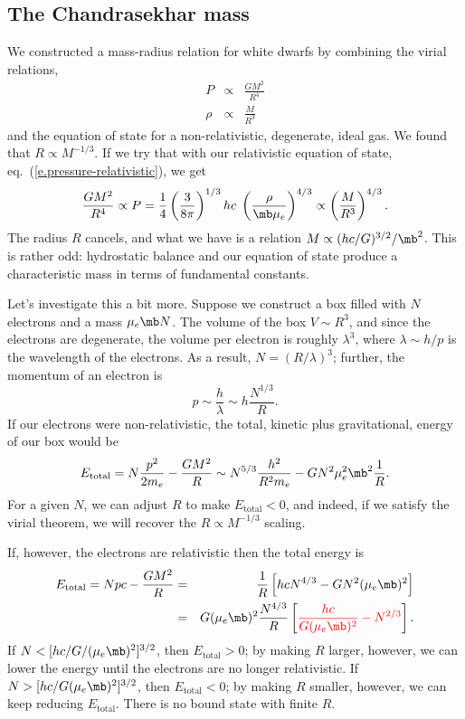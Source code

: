 \subsection{The Chandrasekhar mass}
We constructed a mass-radius relation for white dwarfs by combining the virial relations,
\begin{eqnarray*}
   P    &\propto& \frac{GM^{2}}{R^{4}}\\
   \rho &\propto& \frac{M}{R^{3}}
\end{eqnarray*}
and the equation of state for a non-relativistic, degenerate, ideal gas.  We found that $R\propto M^{-1/3}$.  If we try that with our relativistic equation of state, eq.~(\ref{e.pressure-relativistic}), we get
\[
	\frac{GM^{2}}{R^{4}} \propto P = \frac{1}{4}\left(\frac{3}{8\pi}\right)^{1/3}hc\; \left(\frac{\rho}{\mb\mu_{e}}\right)^{4/3} \propto \left(\frac{M}{R^{3}}\right)^{4/3}.
\]
The radius $R$ cancels, and what we have is a relation $M\propto (hc/G)^{3/2}/\mb^{2}$.  This is rather odd: hydrostatic balance and our equation of state produce a characteristic mass in terms of fundamental constants.

Let's investigate this a bit more.  Suppose we construct a box filled with $N$ electrons and a mass $\mu_{e}\mb N$.  The volume of the box $V \sim R^{3}$, and since the electrons are degenerate, the volume per electron is roughly $\lambda^{3}$, where $\lambda \sim h/p$ is the wavelength of the electrons.  As a result, $N = (R/\lambda)^{3}$; further, the momentum of an electron is
\[	p \sim \frac{h}{\lambda} \sim h\frac{N^{1/3}}{R}. \]
If our electrons were non-relativistic, the total, kinetic plus gravitational, energy of our box would be
\[
	E_{\mathrm{total}} = N\frac{p^{2}}{2m_{e}} - \frac{GM^{2}}{R} \sim N^{5/3}\frac{h^{2}}{R^{2}m_{e}} - GN^{2}\mu_{e}^{2}\mb^{2} \frac{1}{R}.
\]
For a given $N$, we can adjust $R$ to make $E_{\mathrm{total}}<0$, and indeed, if we satisfy the virial theorem, we will recover the $R\propto M^{-1/3}$ scaling.

If, however, the electrons are relativistic then the total energy is
\begin{eqnarray*}
	E_{\mathrm{total}} = Npc - \frac{GM^{2}}{R} 
		&=& \frac{1}{R}\left[hc N^{4/3} - G N^{2}(\mu_{e}\mb)^{2}\right]\\
		&=& G(\mu_{e}\mb)^{2}\frac{N^{4/3}}{R}\left[ {\color{red}\frac{hc}{G(\mu_{e}\mb)^{2}} - N^{2/3}}\right].
\end{eqnarray*}
If $N < [hc/G/(\mu_{e}\mb)^{2}]^{3/2}$, then $E_{\mathrm{total}} > 0$; by making $R$ larger, however, we can lower the energy until the electrons are no longer relativistic.  If $N > [hc/G(\mu_{e}\mb)^{2}]^{3/2}$, then $E_{\mathrm{total}} < 0$; by making $R$ smaller, however, we can keep reducing $E_{\mathrm{total}}$.  There is no bound state with finite $R$.

